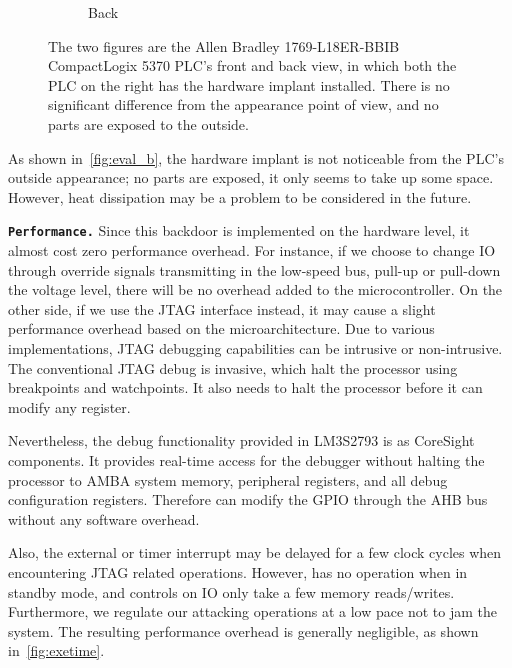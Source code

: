 \begin{figure}[h]
\begin{subfigure}[b]{0.22\textwidth}
        \vspace{-0.15in}
	\caption{Back}
		\label{fig:eval_b2}
	\end{subfigure}
    \vspace{-0.15in}
    \caption{The two figures are the Allen Bradley 1769-L18ER-BBIB CompactLogix 5370 PLC's front and back view, in which both the PLC on the right has the hardware implant installed. There is no significant difference from the appearance point of view, and no parts are exposed to the outside.}
		\label{fig:eval_b}
	\vspace{-0.15in}
\end{figure}

As shown in~\autoref{fig:eval_b}, the hardware implant is not noticeable from the PLC's outside appearance; no parts are exposed, it only seems to take up some space. However, heat dissipation may be a problem to be considered in the future.


\texttt{\textbf{Performance.}} Since this backdoor is implemented on the hardware level, it almost cost zero performance overhead. For instance, if we choose to change IO through override signals transmitting in the low-speed bus, pull-up or pull-down the voltage level, there will be no overhead added to the microcontroller. On the other side, if we use the JTAG interface instead, it may cause a slight performance overhead based on the microarchitecture. Due to various implementations, JTAG debugging capabilities can be intrusive or non-intrusive. The conventional JTAG debug is invasive, which halt the processor using breakpoints and watchpoints. It also needs to halt the processor before it can modify any register.

Nevertheless, the debug functionality provided in LM3S2793 is as CoreSight components. It provides real-time access for the debugger without halting the processor to AMBA system memory, peripheral registers, and all debug configuration registers. Therefore \name can modify the GPIO through the AHB bus without any software overhead.

Also, the external or timer interrupt may be delayed for a few clock cycles when encountering JTAG related operations. However, \name has no operation when in standby mode, and controls on IO only take a few memory reads/writes. Furthermore, we regulate our attacking operations at a low pace not to jam the system.  The resulting performance overhead is generally negligible, as shown in~\autoref{fig:exetime}.

